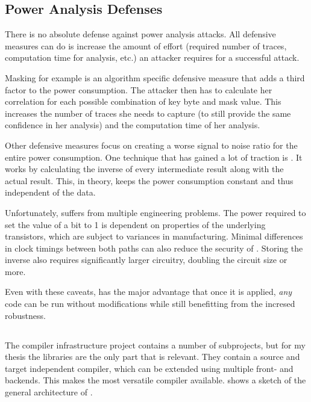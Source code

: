 \subsection{Power Analysis Defenses}
There is no absolute defense against power analysis attacks.
All defensive measures can do is increase the amount of effort (required number of traces, computation time for analysis, etc.) an attacker requires for a successful attack.

Masking for example is an algorithm specific defensive measure that adds a third factor to the power consumption.
The attacker then has to calculate her correlation for each possible combination of key byte and mask value.
This increases the number of traces she needs to capture (to still provide the same confidence in her analysis) and the computation time of her analysis.

Other defensive measures focus on creating a worse signal to noise ratio for the entire power consumption.
One technique that has gained a lot of traction is \dual{}\cite{sokolov2005design}.
It works by calculating the inverse of every intermediate result along with the actual result.
This, in theory, keeps the power consumption constant and thus independent of the data.

Unfortunately, \dual{} suffers from multiple engineering problems.
The power required to set the value of a bit to 1 is dependent on properties of the underlying transistors, which are subject to variances in manufacturing.\cite{razafindraibe2006formal}
Minimal differences in clock timings between both paths can also reduce the security of \dual{}\cite{baddam2008path}.
Storing the inverse also requires significantly larger circuitry, doubling the circuit size or more\cite{baddam2008path}.

Even with these caveats, \dual{} has the major advantage that once it is applied, \emph{any} code can be run without modifications while still benefitting from the incresed robustness.

\subsection{\llvm{}}
\label{llvm}
The \llvm{} compiler infrastructure project\cite{lattner2010llvm} contains a number of subprojects, but for my thesis the \lc{} libraries are the only part that is relevant.
They contain a source and target independent compiler, which can be extended using multiple front- and backends.
This makes \llvm{} the most versatile compiler available.
 shows a sketch of the general architecture of \llvm{}.

